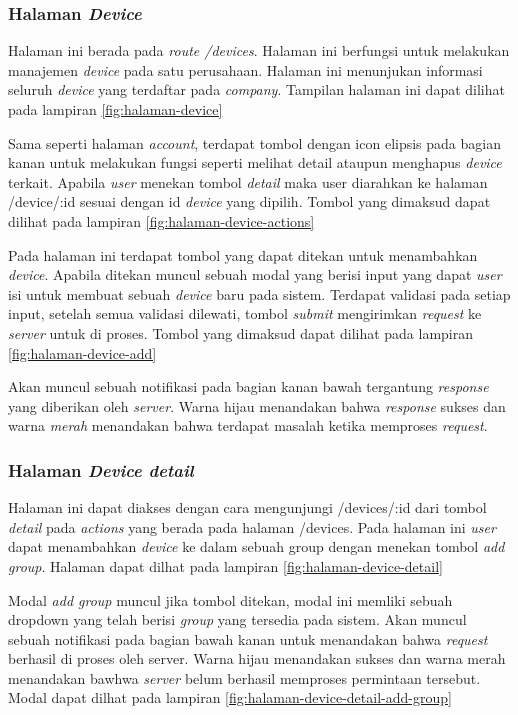 \subsubsection{Halaman \textit{Device}}
Halaman ini berada pada \textit{route /devices}. Halaman ini berfungsi untuk melakukan manajemen \textit{device} pada satu perusahaan. Halaman ini menunjukan informasi seluruh \textit{device} yang terdaftar pada \textit{company}. Tampilan halaman ini dapat dilihat pada lampiran \ref{fig:halaman-device}

Sama seperti halaman \textit{account}, terdapat tombol dengan icon elipsis pada bagian kanan untuk melakukan fungsi seperti melihat detail ataupun menghapus \textit{device} terkait. Apabila \textit{user} menekan tombol \textit{detail} maka user diarahkan ke halaman /device/:id sesuai dengan id \textit{device} yang dipilih. Tombol yang dimaksud dapat dilihat pada lampiran \ref{fig:halaman-device-actions}

Pada halaman ini terdapat tombol yang dapat ditekan untuk menambahkan \textit{device}. Apabila ditekan muncul sebuah modal yang berisi input yang dapat \textit{user} isi untuk membuat sebuah \textit{device} baru pada sistem. Terdapat validasi pada setiap input, setelah semua validasi dilewati, tombol \textit{submit} mengirimkan \textit{request} ke \textit{server} untuk di proses. Tombol yang dimaksud dapat dilihat pada lampiran \ref{fig:halaman-device-add}

Akan muncul sebuah notifikasi pada bagian kanan bawah tergantung \textit{response} yang diberikan oleh \textit{server}. Warna hijau menandakan bahwa \textit{response} sukses dan warna \textit{merah} menandakan bahwa terdapat masalah ketika memproses \textit{request}.

\subsubsection{Halaman \textit{Device detail}}
Halaman ini dapat diakses dengan cara mengunjungi /devices/:id dari tombol \textit{detail} pada \textit{actions} yang berada pada halaman /devices. Pada halaman ini \textit{user} dapat menambahkan \textit{device} ke dalam sebuah group dengan menekan tombol \textit{add group}. Halaman dapat dilhat pada lampiran \ref{fig:halaman-device-detail}

Modal \textit{add group} muncul jika tombol ditekan, modal ini memliki sebuah dropdown yang telah berisi \textit{group} yang tersedia pada sistem. Akan muncul sebuah notifikasi pada bagian bawah kanan untuk menandakan bahwa \textit{request} berhasil di proses oleh server. Warna hijau menandakan sukses dan warna merah menandakan bawhwa \textit{server} belum berhasil memproses permintaan tersebut. Modal dapat dilhat pada lampiran \ref{fig:halaman-device-detail-add-group}

